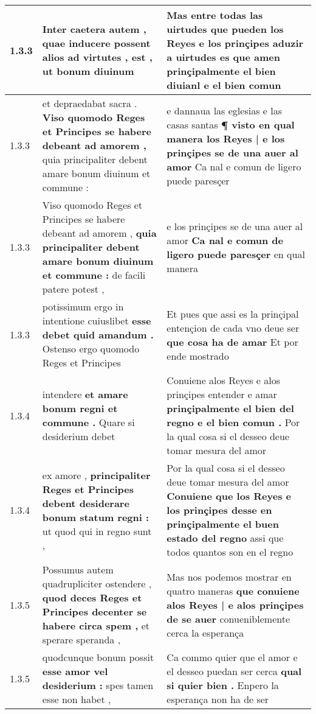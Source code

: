 \begin{tabular}{|p{1cm}|p{6.5cm}|p{6.5cm}|}
1.3.3 & Inter caetera autem , \textbf{ quae inducere possent alios ad virtutes , } est , ut bonum diuinum & Mas entre todas las uirtudes \textbf{ que pueden los Reyes } e los prinçipes aduzir a uirtudes es que amen prinçipalmente el bien diuianl e el bien comun \\\hline
1.3.3 & et depraedabat sacra . \textbf{ Viso quomodo Reges et Principes se habere debeant ad amorem , } quia principaliter debent amare bonum diuinum et commune : & e dannaua las eglesias e las casas santas \textbf{ ¶ visto en qual manera los Reyes | e los prinçipes se de una auer al amor } Ca nal e comun de ligero puede paresçer \\\hline
1.3.3 & Viso quomodo Reges et Principes se habere debeant ad amorem , \textbf{ quia principaliter debent amare bonum diuinum et commune : } de facili patere potest , & e los prinçipes se de una auer al amor \textbf{ Ca nal e comun de ligero puede paresçer } en qual manera \\\hline
1.3.3 & potissimum ergo in intentione cuiuslibet \textbf{ esse debet quid amandum . } Ostenso ergo quomodo Reges et Principes & Et pues que assi es la prinçipal entençion de cada vno deue ser \textbf{ que cosa ha de amar } Et por ende mostrado \\\hline
1.3.4 & intendere \textbf{ et amare bonum regni et commune . } Quare si desiderium debet & Conuiene alos Reyes e alos prinçipes entender e amar \textbf{ prinçipalmente el bien del regno e el bien comun . } Por la qual cosa si el desseo deue tomar mesura del amor \\\hline
1.3.4 & ex amore , \textbf{ principaliter Reges et Principes debent desiderare bonum statum regni : } ut quod qui in regno sunt , & Por la qual cosa si el desseo deue tomar mesura del amor \textbf{ Conuiene que los Reyes e los prinçipes desse en prinçipalmente el buen estado del regno } assi que todos quantos son en el regno \\\hline
1.3.5 & Possumus autem quadrupliciter ostendere , \textbf{ quod deces Reges et Principes decenter se habere circa spem , } et sperare speranda , & Mas nos podemos mostrar en quatro maneras \textbf{ que conuiene alos Reyes | e alos prinçipes de se auer } conueniblemente cerca la esperança \\\hline
1.3.5 & quodcunque bonum possit \textbf{ esse amor vel desiderium : } spes tamen esse non habet , & Ca commo quier que el amor e el desseo puedan ser cerca \textbf{ qual si quier bien . } Enpero la esperança non ha de ser \\\hline

\end{tabular}
